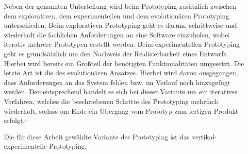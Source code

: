 Neben der genannten Unterteilung wird beim Prototyping zusätzlich zwischen dem explorativen, dem experimentellen und dem evolutionären Prototyping unterschieden. 
Beim explorativen Prototyping geht es darum, schrittweise und wiederholt die fachlichen Anforderungen an eine Software einzuholen, wobei iterativ mehrere Prototypen erstellt werden. 
Beim experimentellen Prototyping geht es grundsätzlich um den Nachweis der Realisierbarkeit eines Entwurfs. 
Hierbei wird bereits ein Großteil der benötigten Funktionalitäten umgesetzt. Die letzte Art ist die des evolutionären Ansatzes. 
Hierbei wird davon ausgegangen, dass Anforderungen an das System fehlen bzw. im Verlauf noch hinzugefügt werden. 
Dementsprechend handelt es sich bei dieser Variante um ein iteratives Verfahren, welches die beschriebenen Schritte des Prototyping mehrfach wiederholt, sodass am Ende ein Übergang vom Prototyp zum fertigen Produkt erfolgt.\autocite[Vgl.][S. 370]{MS-Alpar.2019}$^,$\autocite[Vgl.][S. 6-12]{MS-Floyd.1984} 

Die für diese Arbeit gewählte Variante des Prototyping ist das vertikal-experimentelle Prototyping.